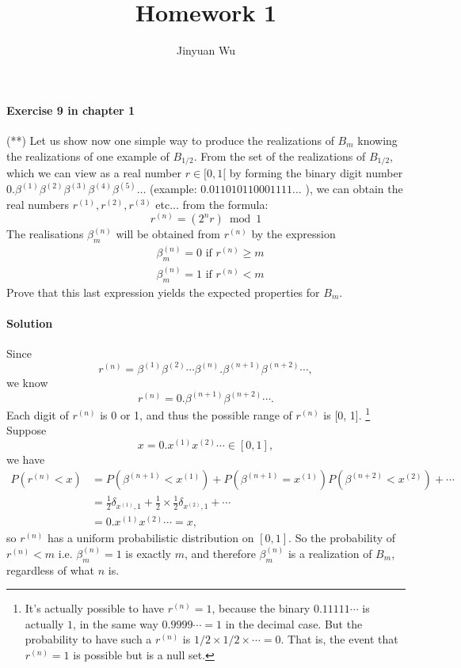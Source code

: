 \documentclass[hyperref, a4paper]{article}
\title{Homework 1}
\author{Jinyuan Wu}
\begin{document}
\maketitle

\paragraph{Exercise 9 in chapter 1} (**) Let us show now one simple way to produce the realizations of $B_m$ knowing the realizations of one example of $B_{1 / 2}$. From the set of the realizations of $B_{1 / 2}$, which we can view as a real number $r \in[0,1[$ by forming the binary digit number $0.\beta^{(1)} \beta^{(2)} \beta^{(3)} \beta^{(4)} \beta^{(5)} \ldots$ (example: $0.011010110001111 \ldots$ ), we can obtain the real numbers $r^{(1)}, r^{(2)}, r^{(3)}$ etc... from the formula:
$$
r^{(n)}=\left(2^n r\right) \bmod 1
$$
The realisations $\beta_m^{(n)}$ will be obtained from $r^{(n)}$ by the expression
$$
\begin{aligned}
&\beta_m^{(n)}=0 \text { if } r^{(n)} \geqslant m \\
&\beta_m^{(n)}=1 \text { if } r^{(n)}<m
\end{aligned}
$$
Prove that this last expression yields the expected properties for $B_m$.

\paragraph{Solution} Since 
\[
    r^{(n)} = \beta^{(1)} \beta^{(2)} \cdots \beta^{(n)} . \beta^{(n+1)} \beta^{(n+2)} \cdots,
\]
we know 
\begin{equation}
    r^{(n)} = 0. \beta^{(n + 1)} \beta^{(n+2)} \cdots.
\end{equation}
Each digit of $r^{(n)}$ is 0 or 1, 
and thus the possible range of $r^{(n)}$ is [0, 1].%
\footnote{
    It's actually possible to have $r^{(n)} = 1$,
    because the binary $0.11111\cdots$ is actually $1$,
    in the same way $0.9999\cdots = 1$ in the decimal case.
    But the probability to have such a $r^{(n)}$ is $1/2 \times 1/2 \times \cdots = 0$.
    That is, the event that $r^{(n)} = 1$ is possible but is a null set.
} 
Suppose 
\[
    x = 0.x^{(1)} x^{(2)} \cdots \in [0, 1],
\]
we have 
\[
    \begin{aligned}
        P(r^{(n)} < x) &= P(\beta^{(n+1)} < x^{(1)}) + P(\beta^{(n+1)} = x^{(1)}) P(\beta^{(n+2)} < x^{(2)}) + \cdots \\
        &= \frac{1}{2} \delta_{x^{(1)}, 1} + \frac{1}{2} \times \frac{1}{2} \delta_{x^{(2)}, 1} + \cdots \\
        &= 0.x^{(1)} x^{(2)} \cdots = x,
    \end{aligned}
\]
so $r^{(n)}$ has a uniform probabilistic distribution on $[0, 1]$.
So the probability of $r^{(n)} < m$ i.e. $\beta^{(n)}_m = 1$ is exactly $m$,
and therefore $\beta^{(n)}_m$ is a realization of $B_m$, regardless of what $n$ is.
\end{document}
